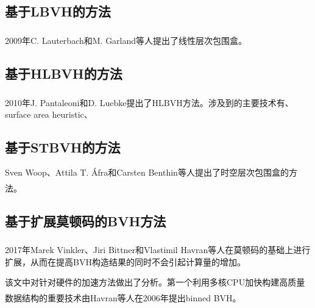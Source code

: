 \documentclass[11pt]{article}
\newcommand{\upcite}[1]{\textsuperscript{\textsuperscript{\cite{#1}}}}
\begin{document}
\subsection{基于LBVH的方法}
2009年C. Lauterbach和M. Garland等人提出了线性层次包围盒\upcite{LBVH}。



\subsection{基于HLBVH的方法}
2010年J. Pantaleoni和D. Luebke提出了HLBVH方法\upcite{HLBVH}。涉及到的主要技术有、surface area heuristic、

\subsection{基于STBVH的方法}
Sven Woop、Attila T. Áfra和Carsten Benthin等人提出了时空层次包围盒的方法\upcite{STBVH}。

\subsection{基于扩展莫顿码的BVH方法}
2017年Marek Vinkler、Jiri Bittner和Vlastimil Havran\upcite{accelerator2}等人在莫顿码的基础上进行扩展，从而在提高BVH构造结果的同时不会引起计算量的增加。
\par 该文中对针对硬件的加速方法做出了分析。第一个利用多核CPU加快构建高质量数据结构的重要技术由Havran等人在2006年提出binned BVH\upcite{cpus1}。
\end{document}
